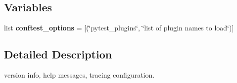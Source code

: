 \subsection*{Variables}
\begin{DoxyCompactItemize}
\item 
\mbox{\label{namespace__pytest_1_1helpconfig_a046cfee86c9f5d85bdcf4d3f4c3541b7}} 
list {\bfseries conftest\+\_\+options} = \mbox{[}(\char`\"{}pytest\+\_\+plugins\char`\"{}, \char`\"{}list of plugin names to load\char`\"{})\mbox{]}
\end{DoxyCompactItemize}


\subsection{Detailed Description}
\begin{DoxyVerb}version info, help messages, tracing configuration.  \end{DoxyVerb}
 
